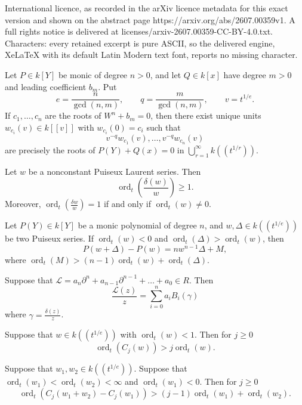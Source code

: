 \documentclass[10pt,a4paper]{amsart}
\DeclareMathOperator{\ord}{ord}
\newcommand{\Dt}{\Delta}
\newcommand{\calL}{{\mathcal{L}}}
\newcommand{\dd}{\delta}
\begin{document}
International licence, as recorded in the arXiv licence metadata for this exact version and shown on the abstract page https://arxiv.org/abs/2607.00359v1. A full rights notice is delivered at licenses/arxiv-2607.00359-CC-BY-4.0.txt. Characters: every retained excerpt is pure ASCII, so the delivered engine, XeLaTeX with its default Latin Modern text font, reports no missing character.
\begin{proposition}
\label{PROP:Puiseuxsolutions}
Let $P\in k[Y]$ be monic of degree $n>0$, and let $Q\in k[x]$ have degree $m>0$ and leading coefficient $b_m$. Put
\[
  e=\frac{n}{\gcd(n,m)},\qquad q=\frac{m}{\gcd(n,m)},\qquad v=t^{1/e}.
\]
If $c_1,\dots,c_n$ are the roots of $W^n+b_m=0$, then there exist unique units $w_{c_i}(v)\in k[[v]]$ with $w_{c_i}(0)=c_i$ such that
\[
  v^{-q}w_{c_1}(v),\dots,v^{-q}w_{c_n}(v)
\]
are precisely the roots of $P(Y)+Q(x)=0$ in $\bigcup_{r=1}^\infty k((t^{1/r}))$.
\end{proposition}

\begin{lemma}
\label{LM:logderivative}
Let $w$ be a nonconstant Puiseux Laurent series.  Then 
$$
 \ord_t\!\left(\frac{\dd (w)}{w}\right)\ge 1.
$$ 
Moreover, 
$\ord_t\!\left(\frac{\dd w}{w}\right)=1$ if and only if $\ord_t(w)\neq 0$.

\end{lemma}

\begin{lemma}
  \label{LM:order-polynomialdifference}
Let $P(Y) \in k[Y]$ be a monic polynomial of degree $n$, and $w, \Dt \in k((t^{1/e}))$ be two Puiseux series. 
If $\ord_t(w) < 0$ and $\ord_t(\Dt) > \ord_t(w)$, then  
$$P(w+\Dt)-P(w) = nw^{n-1}\Dt + M,$$
where $\ord_t(M)>(n-1)\ord_t(w)+\ord_t(\Delta)$.
\end{lemma}

\begin{lemma}
  \label{LM:Bellformula}
Suppose that $\calL=a_n\partial^n+a_{n-1}\partial^{n-1}+\dots+a_0\in R$.
Then 
$$
   \frac{\calL(z)}{z}=\sum_{i=0}^n a_i B_i(\gamma)
$$
where $\gamma=\frac{\delta(z)}{z}$.
\end{lemma}

\begin{lemma}
  \label{LM:orderofBell1}
  Suppose that $w\in k((t^{1/e}))$ with $\ord_t(w)<1$. Then for $j\geq 0$
  $$
     \ord_t(C_j(w))>j\ord_t(w).
  $$
\end{lemma}

\begin{lemma}
  \label{LM:orderofBell2}
  Suppose that $w_1,w_2\in k((t^{1/e}))$. Suppose that 
  $\ord_t(w_1)<\ord_t(w_2)<\infty$ and $\ord_t(w_1)<0$. Then for $j\geq 0$
  $$
     \ord_t(C_j(w_1+w_2)-C_j(w_1))> (j-1)\ord_t(w_1)+\ord_t(w_2).
  $$
\end{lemma}
\end{document}
